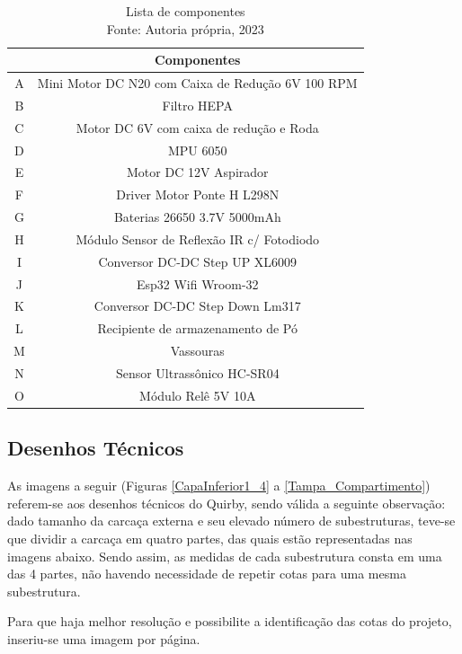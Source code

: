 \begin{table}[h]
    \centering
    \caption{Lista de componentes\\Fonte: Autoria própria, 2023}
    \label{tab:my_label}
    \begin{tabular}{|c|c|}
    \hline
    & Componentes\\ \hline
    A & Mini Motor DC N20 com Caixa de Redução 6V 100 RPM \\ \hline
    B & Filtro HEPA \\ \hline
    C & Motor DC 6V com caixa de redução e Roda \\ \hline
    D & MPU 6050 \\ \hline
    E & Motor DC 12V Aspirador \\ \hline
    F & Driver Motor Ponte H L298N \\ \hline
    G & Baterias 26650 3.7V 5000mAh \\ \hline
    H & Módulo Sensor de Reflexão IR c/ Fotodiodo \\ \hline
    I & Conversor DC-DC Step UP XL6009 \\ \hline
    J & Esp32 Wifi Wroom-32 \\ \hline
    K & Conversor DC-DC Step Down Lm317 \\ \hline
    L & Recipiente de armazenamento de Pó \\ \hline
    M & Vassouras \\ \hline
    N & Sensor Ultrassônico HC-SR04 \\ \hline
    O & Módulo Relê 5V 10A \\ \hline
    \end{tabular}
\end{table}

\newpage
\pagebreak
\subsection{Desenhos Técnicos}
As imagens a seguir (Figuras \ref{CapaInferior1_4} a \ref{Tampa_Compartimento}) referem-se aos desenhos técnicos do Quirby, sendo válida a seguinte observação: dado tamanho da carcaça externa e seu elevado número de subestruturas, teve-se que dividir a carcaça em quatro partes, das quais estão representadas nas imagens abaixo. Sendo assim, as medidas de cada subestrutura consta em uma das 4 partes, não havendo necessidade de repetir cotas para uma mesma subestrutura.


Para que haja melhor resolução e possibilite a identificação das cotas do projeto, inseriu-se uma imagem por página.

